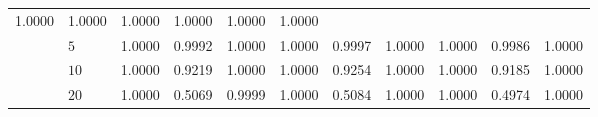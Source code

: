 \documentclass[11pt]{article}
\newcommand{\myT}{\intercal}
\theoremstyle{plain}
\theoremstyle{definition}
\theoremstyle{remark}
\begin{document}
\begin{table}[ht]
\begin{tabular}{llccccccccc}
        1.0000 & 1.0000 & 1.0000 &
        1.0000 & 1.0000 & 1.0000
        \\
        &$5$ &
        1.0000 & 0.9992 & 1.0000 &
        1.0000 & 0.9997 & 1.0000 &
        1.0000 & 0.9986 & 1.0000
        \\
        &$10$  &
        1.0000 & 0.9219 & 1.0000 & %
        1.0000 & 0.9254 & 1.0000 & %
        1.0000 & 0.9185 & 1.0000  %
        \\
        &$20$  &
        1.0000  & 0.5069 & 0.9999  & 
        1.0000  & 0.5084 & 1.0000  &
        1.0000  & 0.4974 & 1.0000 
        \\
        \bottomrule
    \end{tabular}
\end{table}
\end{document}
